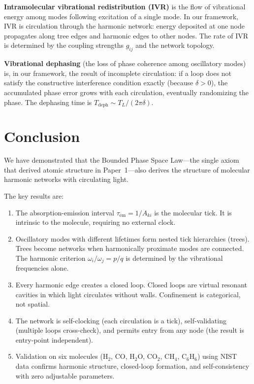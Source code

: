 \documentclass[11pt,twocolumn,a4paper]{article}
\theoremstyle{definition}
\theoremstyle{remark}
\newcommand{\tem}{\tau_{\mathrm{em}}}
\newcommand{\Aki}{A_{ki}}
\begin{document}
\textbf{Intramolecular vibrational redistribution (IVR)} is the flow of vibrational energy among modes following excitation of a single mode. In our framework, IVR is circulation through the harmonic network: energy deposited at one node propagates along tree edges and harmonic edges to other nodes. The rate of IVR is determined by the coupling strengths $g_{ij}$ and the network topology.

\textbf{Vibrational dephasing} (the loss of phase coherence among oscillatory modes) is, in our framework, the result of incomplete circulation: if a loop does not satisfy the constructive interference condition exactly (because $\delta > 0$), the accumulated phase error grows with each circulation, eventually randomizing the phase. The dephasing time is $T_{\mathrm{deph}} \sim T_L / (2\pi \delta)$.

\section{Conclusion}
\label{sec:conclusion}

We have demonstrated that the Bounded Phase Space Law---the single axiom that derived atomic structure in Paper~1---also derives the structure of molecular harmonic networks with circulating light.

The key results are:
\begin{enumerate}
\item The absorption-emission interval $\tem = 1/\Aki$ is the molecular tick. It is intrinsic to the molecule, requiring no external clock.

\item Oscillatory modes with different lifetimes form nested tick hierarchies (trees). Trees become networks when harmonically proximate modes are connected. The harmonic criterion $\omega_i/\omega_j = p/q$ is determined by the vibrational frequencies alone.

\item Every harmonic edge creates a closed loop. Closed loops are virtual resonant cavities in which light circulates without walls. Confinement is categorical, not spatial.

\item The network is self-clocking (each circulation is a tick), self-validating (multiple loops cross-check), and permits entry from any node (the result is entry-point independent).

\item Validation on six molecules (H$_2$, CO, H$_2$O, CO$_2$, CH$_4$, C$_6$H$_6$) using NIST data confirms harmonic structure, closed-loop formation, and self-consistency with zero adjustable parameters.
\end{enumerate}
\end{document}
